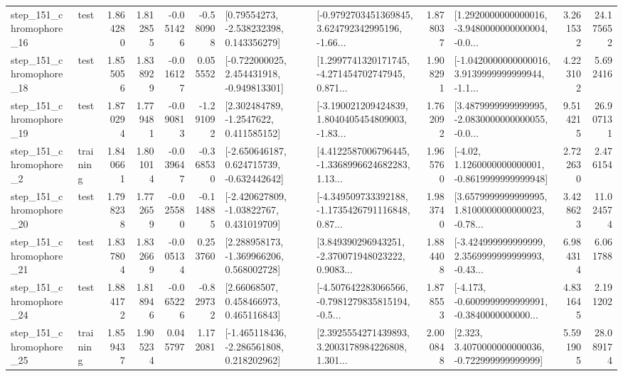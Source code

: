 \begin{tabular}{llrrrrllrlrr}
  step\_151\_chromophore\_16 &      test &      1.864280 &    1.812855 &     -0.051426 & -0.580908 &     [0.79554273, -2.538232398, 0.143356279] &  [-0.9792703451369845, 3.624792342995196, -1.66... &       1.878037 &  [1.2920000000000016, -3.9480000000000004, -0.0... &            3.261532 &         24.175652 \\
  step\_151\_chromophore\_18 &      test &      1.855056 &    1.838929 &     -0.016127 &  0.055552 &   [-0.722000025, 2.454431918, -0.949813301] &  [1.2997741320171745, -4.271454702747945, 0.871... &       1.908291 &  [-1.0420000000000016, 3.9139999999999944, -1.1... &            4.223102 &          5.692416 \\
  step\_151\_chromophore\_19 &      test &      1.870294 &    1.779481 &     -0.090813 & -1.291092 &      [2.302484789, -1.2547622, 0.411585152] &  [-3.190021209424839, 1.8040405454809003, -1.83... &       1.762092 &  [3.4879999999999995, -2.0830000000000055, -0.0... &            9.514215 &         26.907131 \\
   step\_151\_chromophore\_2 &  training &      1.840661 &    1.801014 &     -0.039647 & -0.368530 &   [-2.650646187, 0.624715739, -0.632442642] &  [4.4122587006796445, -1.3368996624682283, 1.13... &       1.965760 &   [-4.02, 1.1260000000000001, -0.8619999999999948] &            2.722630 &          2.476154 \\
  step\_151\_chromophore\_20 &      test &      1.798238 &    1.772659 &     -0.025580 & -0.114885 &    [-2.420627809, -1.03822767, 0.431019709] &  [-4.349509733392188, -1.1735426791116848, 0.87... &       1.983740 &  [3.6579999999999995, 1.8100000000000023, -0.78... &            3.428623 &         11.024574 \\
  step\_151\_chromophore\_21 &      test &      1.837804 &    1.832669 &     -0.005134 &  0.253760 &    [2.288958173, -1.369966206, 0.568002728] &  [3.849390296943251, -2.370071948023222, 0.9083... &       1.884408 &  [-3.424999999999999, 2.3569999999999993, -0.43... &            6.984314 &          6.061788 \\
  step\_151\_chromophore\_24 &      test &      1.884172 &    1.818946 &     -0.065226 & -0.829732 &      [2.66068507, 0.458466973, 0.465116843] &  [-4.507642283066566, -0.7981279835815194, -0.5... &       1.878553 &  [-4.173, -0.6009999999999991, -0.3840000000000... &            4.831645 &          2.191202 \\
  step\_151\_chromophore\_25 &  training &      1.859437 &    1.905234 &      0.045797 &  1.172081 &   [-1.465118436, -2.286561808, 0.218202962] &  [2.3925554271439893, 3.2003178984226808, 1.301... &       2.000848 &    [2.323, 3.4070000000000036, -0.722999999999999] &            5.591905 &         28.089174 \\

\end{tabular}
